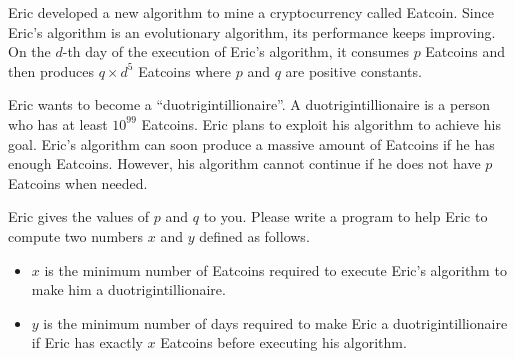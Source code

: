 Eric developed a new algorithm to mine a cryptocurrency called 
Eatcoin. 
Since Eric's algorithm is an evolutionary algorithm,
its performance keeps improving. 
On the $d$-th day of the execution of Eric's algorithm, 
it consumes $p$ Eatcoins and then
produces $q\times d^5$ Eatcoins where $p$ and $q$
are positive constants.

Eric wants to become a ``duotrigintillionaire''. 
A duotrigintillionaire is a person who has at least $10^{99}$ Eatcoins. 
Eric plans to exploit his algorithm to achieve his goal.
Eric's algorithm can soon produce a massive amount of Eatcoins if
he has enough Eatcoins.
However, his algorithm cannot continue if he does not have
$p$ Eatcoins when needed.

Eric gives the values of $p$ and $q$ to you. Please write a program
to help Eric to compute two numbers $x$ and $y$ defined as follows.
\begin{itemize}
\item $x$ is the minimum number of Eatcoins required to execute Eric's 
algorithm to make him a duotrigintillionaire.
\item $y$ is the minimum number of days required to make Eric a 
duotrigintillionaire if Eric has exactly $x$ Eatcoins before executing his algorithm.
\end{itemize}
